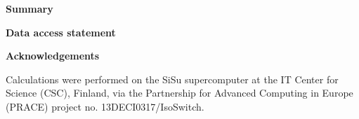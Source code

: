 \textbf{Summary}



\textbf{Data access statement}

\textbf{Acknowledgements}

Calculations were performed on the SiSu supercomputer at the IT Center for Science (CSC), Finland, via the Partnership for Advanced Computing in Europe (PRACE) project no. 13DECI0317/IsoSwitch.
